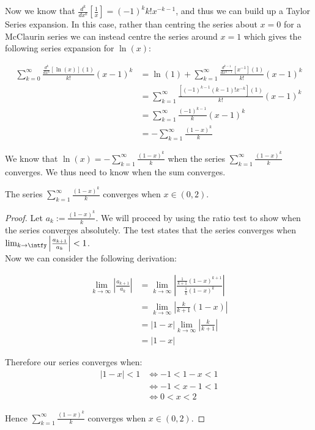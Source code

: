 Now we know that \(\frac{d^k}{dx^k}[\frac{1}{x}] = (-1)^kk!x^{-k-1}\), and thus we can build up a Taylor Series expansion. In this case, rather than centring the series about \(x=0\) for a McClaurin series we can instead centre the series around \(x=1\) which gives the following series expansion for \(\ln(x)\):

\begin{align*}
	\sum_{k=0}^\infty \frac{\frac{d^k}{dx^k}[\ln(x)](1)}{k!}(x-1)^k
		&=\ln(1) + \sum_{k=1}^\infty\frac{\frac{d^{k-1}}{dx^{k-1}}
			[x^{-1}](1)}{k!}(x-1)^k\\
		&=\sum_{k=1}^\infty\frac{[(-1)^{k-1}(k-1)!x^{-k}](1)}
			{k!}(x-1)^k\\
		&=\sum_{k=1}^\infty\frac{(-1)^{k-1}}{k}(x-1)^k\\
		&=-\sum_{k=1}^\infty\frac{(1-x)^k}{k}
\end{align*}
				
We know that \(\ln(x) = -\sum_{k=1}^\infty\frac{(1-x)^k}{k}\) when the series \(\sum_{k=1}^\infty\frac{(1-x)^k}{k}\) converges. We thus need to know when the sum converges.

\begin{log convergence}
The series \(\sum_{k=1}^\infty\frac{(1-x)^k}{k}\) converges when \(x \in (0,2)\).
\end{log convergence}
\begin{proof}
Let \(a_k := \frac{(1-x)^k}{k}\). We will proceed by using the ratio test to show when the series converges absolutely. The test states that the series converges when \(\lim_{k\to\intfy} \left|\frac{a_{k+1}}{a_k}\right| < 1\).\\

Now we can consider the following derivation:

\begin{align*}
	\lim_{k\to\infty}\left|\frac{a_{k+1}}{a_k}\right|
		&=\lim_{k\to\infty}\left|\frac{\frac{1}{k+1}(1-x)^{k+1}}
			{\frac{1}{k}(1-x)^k}\right|\\
		&=\lim_{k\to\infty}\left|\frac{k}{k+1}(1-x)\right|\\
		&=|1-x|\lim_{k\to\infty}\left|\frac{k}{k+1}\right|\\
		&=|1-x|
\end{align*}

Therefore our series converges when:
\begin{align*}
	|1-x| < 1 &\iff -1 < 1 - x < 1\\
		&\iff -1 < x - 1 < 1\\
		&\iff 0 < x < 2
\end{align*}

Hence \(\sum_{k=1}^\infty \frac{(1-x)^k}{k}\) converges when \(x \in (0, 2)\).
\end{proof}

